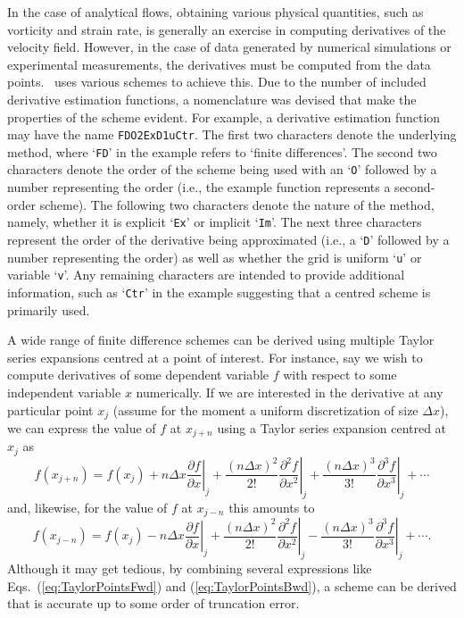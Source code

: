 \documentclass[10pt, twoside]{book}
\begin{document}
		In the case of analytical flows, obtaining various physical quantities, such as vorticity and strain rate, is generally an exercise in computing derivatives of the velocity field. However, in the case of data generated by numerical simulations or experimental measurements, the derivatives must be computed from the data points. \MATfluids\ uses various schemes to achieve this. Due to the number of included derivative estimation functions, a nomenclature was devised that make the properties of the scheme evident. For example, a derivative estimation function may have the name \texttt{FDO2ExD1uCtr}. The first two characters denote the underlying method, where `\texttt{FD}' in the example refers to `finite differences'. The second two characters denote the order of the scheme being used with an `\texttt{O}' followed by a number representing the order (i.e., the example function represents a second-order scheme). The following two characters denote the nature of the method, namely, whether it is explicit `\texttt{Ex}' or implicit `\texttt{Im}'. The next three characters represent the order of the derivative being approximated (i.e., a `\texttt{D}' followed by a number representing the order) as well as whether the grid is uniform `\texttt{u}' or variable `\texttt{v}'. Any remaining characters are intended to provide additional information, such as `\texttt{Ctr}' in the example suggesting that a centred scheme is primarily used.
		
		A wide range of finite difference schemes can be derived using multiple Taylor series expansions centred at a point of interest. For instance, say we wish to compute derivatives of some dependent variable $f$ with respect to some independent variable $x$ numerically. If we are interested in the derivative at any particular point $x_j$ (assume for the moment a uniform discretization of size ${\Delta}x$), we can express the value of $f$ at $x_{j+n}$ using a Taylor series expansion centred at $x_{j}$ as
		\begin{equation}
		\label{eq:TaylorPointsFwd}
			f\left(x_{j+n}\right) = f\left(x_j\right) + n{\Delta}x\left.\frac{\partial f}{\partial x}\right|_j + \frac{\left(n{\Delta}x\right)^2}{2!}\left.\frac{\partial^2 f}{\partial x^2}\right|_j + \frac{\left(n{\Delta}x\right)^3}{3!}\left.\frac{\partial^3 f}{\partial x^3}\right|_j + \cdots
		\end{equation}
		and, likewise, for the value of $f$ at $x_{j-n}$ this amounts to
		\begin{equation}
		\label{eq:TaylorPointsBwd}
			f\left(x_{j-n}\right) = f\left(x_j\right) - n{\Delta}x\left.\frac{\partial f}{\partial x}\right|_j + \frac{\left(n{\Delta}x\right)^2}{2!}\left.\frac{\partial^2 f}{\partial x^2}\right|_j - \frac{\left(n{\Delta}x\right)^3}{3!}\left.\frac{\partial^3 f}{\partial x^3}\right|_j + \cdots.
		\end{equation}
		Although it may get tedious, by combining several expressions like Eqs.~(\ref{eq:TaylorPointsFwd}) and (\ref{eq:TaylorPointsBwd}), a scheme can be derived that is accurate up to some order of truncation error.
		
\end{document}

